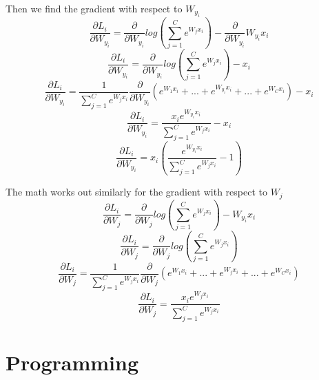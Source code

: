 \documentclass[12pt]{article}
\begin{document}
\noindent Then we find the gradient with respect to $W_{y_{i}}$
\begin{equation}
    \frac{\partial L_{i}}{\partial W_{y_{i}}} = \frac{\partial}{\partial W_{y_{i}}} 
    log({\sum_{j=1}^C e^{W_{j}x_{i}}}) 
    - \frac{\partial}{\partial W_{y_{i}}}W_{y_{i}}x_{i}
\end{equation}
\begin{equation}
    \frac{\partial L_{i}}{\partial W_{y_{i}}} = \frac{\partial}{\partial W_{y_{i}}} 
    log({\sum_{j=1}^C e^{W_{j}x_{i}}}) 
    - x_{i}
\end{equation}
\begin{equation}
    \frac{\partial L_{i}}{\partial W_{y_{i}}} = \frac{1}{\sum_{j=1}^C e^{W_{j}x_{i}}}
    \frac{\partial}{\partial W_{y_{i}}} 
    (e^{W_{1}x_{i}}+...+e^{W_{y_{i}}x_{i}}+...+e^{W_{C}x_{i}})
    - x_{i}
\end{equation}
\begin{equation}
    \frac{\partial L_{i}}{\partial W_{y_{i}}} = \frac{x_{i}e^{W_{y_{i}}x_{i}}}
    {\sum_{j=1}^C e^{W_{j}x_{i}}} - x_{i}
\end{equation}
\begin{equation}
    \frac{\partial L_{i}}{\partial W_{y_{i}}} = x_{i} (\frac{e^{W_{y_{i}}x_{i}}}
    {\sum_{j=1}^C e^{W_{j}x_{i}}} - 1)
\end{equation}

\noindent The math works out similarly for the gradient with respect to $W_{j}$
\begin{equation}
    \frac{\partial L_{i}}{\partial W_{j}} = \frac{\partial}{\partial W_{j}} 
    log({\sum_{j=1}^C e^{W_{j}x_{i}}}) 
    - W_{y_{i}}x_{i}
\end{equation}
\begin{equation}
    \frac{\partial L_{i}}{\partial W_{j}} = \frac{\partial}{\partial W_{j}} 
    log({\sum_{j=1}^C e^{W_{j}x_{i}}}) 
\end{equation}
\begin{equation}
    \frac{\partial L_{i}}{\partial W_{j}} = \frac{1}{\sum_{j=1}^C e^{W_{j}x_{i}}}
    \frac{\partial}{\partial W_{j}} 
    (e^{W_{1}x_{i}}+...+e^{W_{j}x_{i}}+...+e^{W_{C}x_{i}})
\end{equation}
\begin{equation}
    \frac{\partial L_{i}}{\partial W_{j}} = \frac{x_{i}e^{W_{j}x_{i}}}
    {\sum_{j=1}^C e^{W_{j}x_{i}}}
\end{equation}

\section{Programming}
\end{document}
